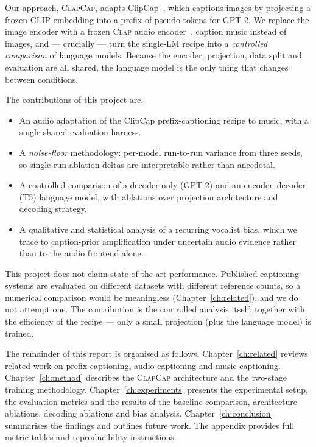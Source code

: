 \documentclass[9pt]{report}
\newcommand{\clapenc}{\textsc{Clap}}
\newcommand{\sys}{\textsc{ClapCap}}
\begin{document}
Our approach, \sys{}, adapts ClipCap~\cite{mokady2021clipcap}, which captions images by
projecting a frozen CLIP embedding into a prefix of pseudo-tokens for GPT-2. We replace the image
encoder with a frozen \clapenc{} audio encoder~\cite{wu2023clap}, caption music instead of
images, and --- crucially --- turn the single-LM recipe into a \emph{controlled comparison} of
language models. Because the encoder, projection, data split and evaluation are all shared, the
language model is the only thing that changes between conditions.

The contributions of this project are:
\begin{itemize}\itemsep2pt
  \item An audio adaptation of the ClipCap prefix-captioning recipe to music, with a single
        shared evaluation harness.
  \item A \emph{noise-floor} methodology: per-model run-to-run variance from three seeds, so
        single-run ablation deltas are interpretable rather than anecdotal.
  \item A controlled comparison of a decoder-only (GPT-2) and an encoder--decoder (T5) language
        model, with ablations over projection architecture and decoding strategy.
  \item A qualitative and statistical analysis of a recurring vocalist bias, which we trace to
        caption-prior amplification under uncertain audio evidence rather than to the audio
        frontend alone.
\end{itemize}

This project does not claim state-of-the-art performance. Published captioning systems are
evaluated on different datasets with different reference counts, so a numerical comparison
would be meaningless (Chapter~\ref{ch:related}), and we do not attempt one. The contribution
is the controlled analysis itself, together with the efficiency of the recipe --- only a small
projection (plus the language model) is trained.

The remainder of this report is organised as follows. Chapter~\ref{ch:related} reviews related
work on prefix captioning, audio captioning and music captioning.
Chapter~\ref{ch:method} describes the \sys{} architecture and the two-stage training
methodology. Chapter~\ref{ch:experiments} presents the experimental setup, the evaluation
metrics and the results of the baseline comparison, architecture ablations, decoding ablations
and bias analysis. Chapter~\ref{ch:conclusion} summarises the findings and outlines future
work. The appendix provides full metric tables and reproducibility instructions.
\end{document}
